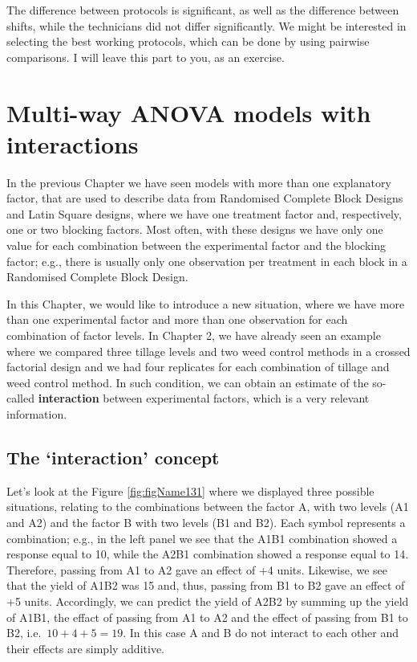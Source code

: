 \documentclass[a4paper,12pt,oneside]{book}
\begin{document}
The difference between protocols is significant, as well as the difference between shifts, while the technicians did not differ significantly. We might be interested in selecting the best working protocols, which can be done by using pairwise comparisons. I will leave this part to you, as an exercise.

\hypertarget{multi-way-anova-models-with-interactions}{%
\chapter{Multi-way ANOVA models with interactions}\label{multi-way-anova-models-with-interactions}}

In the previous Chapter we have seen models with more than one explanatory factor, that are used to describe data from Randomised Complete Block Designs and Latin Square designs, where we have one treatment factor and, respectively, one or two blocking factors. Most often, with these designs we have only one value for each combination between the experimental factor and the blocking factor; e.g., there is usually only one observation per treatment in each block in a Randomised Complete Block Design.

In this Chapter, we would like to introduce a new situation, where we have more than one experimental factor and more than one observation for each combination of factor levels. In Chapter 2, we have already seen an example where we compared three tillage levels and two weed control methods in a crossed factorial design and we had four replicates for each combination of tillage and weed control method. In such condition, we can obtain an estimate of the so-called \textbf{interaction} between experimental factors, which is a very relevant information.

\hypertarget{the-interaction-concept}{%
\section{The `interaction' concept}\label{the-interaction-concept}}

Let's look at the Figure \ref{fig:figName131} where we displayed three possible situations, relating to the combinations between the factor A, with two levels (A1 and A2) and the factor B with two levels (B1 and B2). Each symbol represents a combination; e.g., in the left panel we see that the A1B1 combination showed a response equal to 10, while the A2B1 combination showed a response equal to 14. Therefore, passing from A1 to A2 gave an effect of +4 units. Likewise, we see that the yield of A1B2 was 15 and, thus, passing from B1 to B2 gave an effect of +5 units. Accordingly, we can predict the yield of A2B2 by summing up the yield of A1B1, the effact of passing from A1 to A2 and the effect of passing from B1 to B2, i.e.~\(10 + 4 + 5 = 19\). In this case A and B do not interact to each other and their effects are simply additive.
\end{document}
